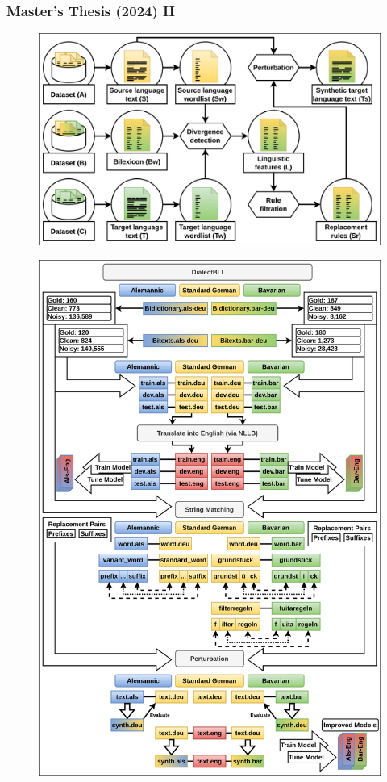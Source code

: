\documentclass[aspectratio=169]{beamer}
\begin{document}
\begin{frame}[fragile]
	\frametitle{Master's Thesis (2024) II}
    \begin{minipage}{.7\textwidth}
        \begin{figure}
            \centering
            \includegraphics[width=1.0\textwidth]{images/ChameleonMT-CODE-MethodsOverviewLandscape.png} 
        \end{figure}
    \end{minipage}%
    \begin{minipage}{.3\textwidth}
        \begin{figure}
            \centering
            \includegraphics[width=1.0\textwidth]{images/ChameleonMT-SYNTH-SYNTHDialectBLI.png} 

\end{figure}
\end{minipage}
\end{frame}
\end{document}
